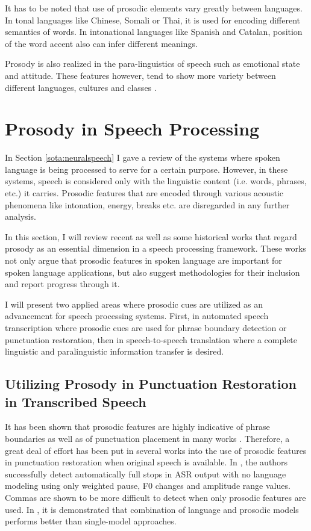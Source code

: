 It has to be noted that use of prosodic elements vary greatly between languages. In tonal languages like Chinese, Somali or Thai, it is used for encoding different semantics of words. In intonational languages like Spanish and Catalan, position of the word accent also can infer different meanings. 

Prosody is also realized in the para-linguistics of speech such as emotional state and attitude. These features however, tend to show more variety between different languages, cultures and classes \citep{cowie}. 


\section{Prosody in Speech Processing}
In Section \ref{sota:neuralspeech} I gave a review of the systems where spoken language is being processed to serve for a certain purpose. However, in these systems, speech is considered only with the linguistic content (i.e. words, phrases, etc.) it carries. Prosodic features that are encoded through various acoustic phenomena like intonation, energy, breaks etc. are disregarded in any further analysis.  

In this section, I will review recent as well as some historical works that regard prosody as an essential dimension in a speech processing framework. These works not only argue that prosodic features in spoken language are important for spoken language applications, but also suggest methodologies for their inclusion and report progress through it. 

I will present two applied areas where prosodic cues are utilized as an advancement for speech processing systems. First, in automated speech transcription where prosodic cues are used for phrase boundary detection or punctuation restoration, then in speech-to-speech translation where a complete linguistic and paralinguistic information transfer is desired.

\subsection{Utilizing Prosody in Punctuation Restoration in Transcribed Speech}
\label{sota:punk_prosody}
It has been shown that prosodic features are highly indicative of phrase boundaries as well as of punctuation placement in many works \citep{punctuation_book}. Therefore, a great deal of effort has been put in several works into the use of prosodic features in punctuation restoration when original speech is available. In \cite{levy2012effect}, the authors successfully detect automatically full stops in ASR output with no language modeling using only weighted pause, F0 changes and amplitude range values. Commas are shown to be more difficult to detect when only prosodic features are used. In \cite{baron2002automatic}, it is demonstrated that combination of language and prosodic models performs better than single-model approaches. 

